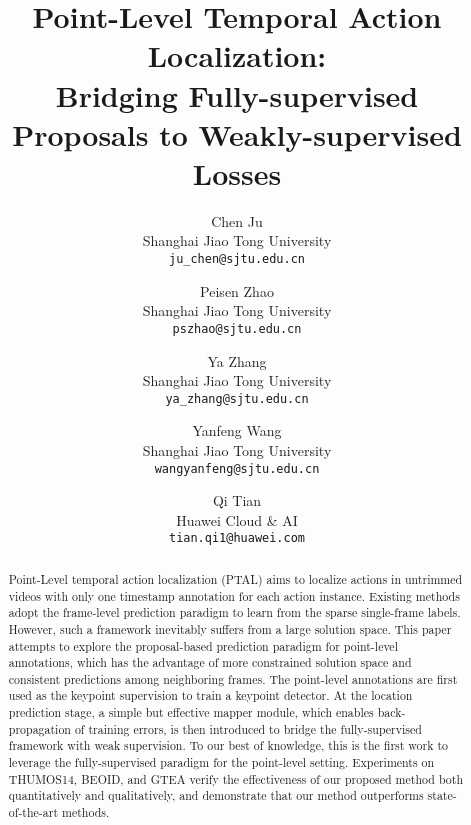 \documentclass[final]{cvpr}
\begin{document}
\title{Point-Level Temporal Action Localization: \\Bridging Fully-supervised Proposals to Weakly-supervised Losses}



\author{Chen Ju\\
Shanghai Jiao Tong University\\
{\tt\small ju\_chen@sjtu.edu.cn}
\and
Peisen Zhao\\
Shanghai Jiao Tong University\\
{\tt\small pszhao@sjtu.edu.cn}
\and
Ya Zhang\\
Shanghai Jiao Tong University\\
{\tt\small ya\_zhang@sjtu.edu.cn}
\and
Yanfeng Wang\\
Shanghai Jiao Tong University\\
{\tt\small wangyanfeng@sjtu.edu.cn}
\and
Qi Tian\\
Huawei Cloud \& AI\\
{\tt\small tian.qi1@huawei.com}
}

\maketitle


\begin{abstract}
Point-Level temporal action localization (PTAL) aims to localize actions in untrimmed videos with only one timestamp annotation for each action instance. Existing methods adopt the frame-level prediction paradigm to learn from the sparse single-frame labels. However, such a framework inevitably suffers from a large solution space. This paper attempts to explore the proposal-based prediction paradigm for point-level annotations, which has the advantage of more constrained solution space and consistent predictions among neighboring frames. The point-level annotations are first used as the keypoint supervision to train a keypoint detector. At the location prediction stage, a simple but effective mapper module, which enables back-propagation of training errors, is then introduced to bridge the fully-supervised framework with weak supervision. To our best of knowledge, this is the first work to leverage the fully-supervised paradigm for the point-level setting. Experiments on THUMOS14, BEOID, and GTEA verify the effectiveness of our proposed method both quantitatively and qualitatively, and demonstrate that our method outperforms state-of-the-art methods.
\end{abstract}
\end{document}
